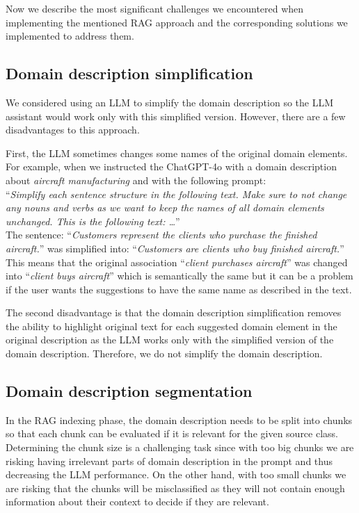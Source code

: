 Now we describe the most significant challenges we encountered when implementing the mentioned RAG approach and the corresponding solutions we implemented to address them.


\subsection{Domain description simplification}

We considered using an LLM to simplify the domain description so the LLM assistant would work only with this simplified version. However, there are a few disadvantages to this approach.

First, the LLM sometimes changes some names of the original domain elements. For example, when we instructed the ChatGPT-4o with a domain description about \textit{aircraft manufacturing} and with the following prompt: \\

\noindent{}``\textit{Simplify each sentence structure in the following text. Make sure to not change any nouns and verbs as we want to keep the names of all domain elements unchanged. This is the following text: \ldots}'' \\

\noindent{}The sentence: ``\textit{Customers represent the clients who purchase the finished aircraft.}'' was simplified into: ``\textit{Customers are clients who buy finished aircraft.}'' This means that the original association ``\textit{client purchases aircraft}'' was changed into ``\textit{client buys aircraft}'' which is semantically the same but it can be a problem if the user wants the suggestions to have the same name as described in the text.

The second disadvantage is that the domain description simplification removes the ability to highlight original text for each suggested domain element in the original description as the LLM works only with the simplified version of the domain description. Therefore, we do not simplify the domain description.


\subsection{Domain description segmentation}

In the RAG indexing phase, the domain description needs to be split into chunks so that each chunk can be evaluated if it is relevant for the given source class. Determining the chunk size is a challenging task since with too big chunks we are risking having irrelevant parts of domain description in the prompt and thus decreasing the LLM performance. On the other hand, with too small chunks we are risking that the chunks will be misclassified as they will not contain enough information about their context to decide if they are relevant.


